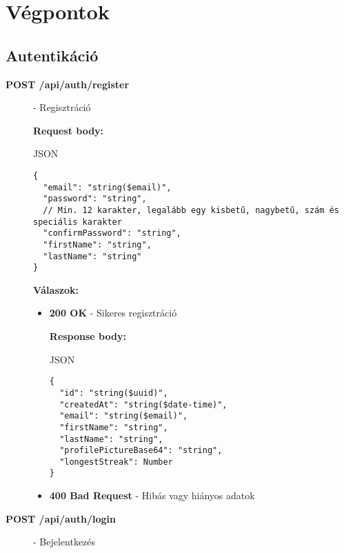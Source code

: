 \documentclass[12pt]{report}
\begin{document}
\section{Végpontok}

\vspace{0.5cm}
\subsection{Autentikáció}
\begin{description}

  \item [\textbf{POST /api/auth/register}] - Regisztráció
  
    \vspace{0.5cm}
    \textbf{Request body:}
    \begin{codeblock}{JSON}
      \begin{verbatim}
{
  "email": "string($email)",
  "password": "string",
  // Min. 12 karakter, legalább egy kisbetű, nagybetű, szám és speciális karakter
  "confirmPassword": "string",
  "firstName": "string",
  "lastName": "string"
}
      \end{verbatim}
    \end{codeblock}

    \vspace{0.5cm}
    \textbf{Válaszok:}
    \begin{itemize}
      \item \textbf{200 OK} - Sikeres regisztráció
      
        \textbf{Response body:}
        \begin{codeblock}{JSON}
          \begin{verbatim}
{
  "id": "string($uuid)",
  "createdAt": "string($date-time)",
  "email": "string($email)",
  "firstName": "string",
  "lastName": "string",
  "profilePictureBase64": "string",
  "longestStreak": Number
}
          \end{verbatim}
        \end{codeblock}

      \item \textbf{400 Bad Request} - Hibás vagy hiányos adatok
    \end{itemize}

  \item [\textbf{POST /api/auth/login}] - Bejelentkezés
  

\end{description}
\end{document}
